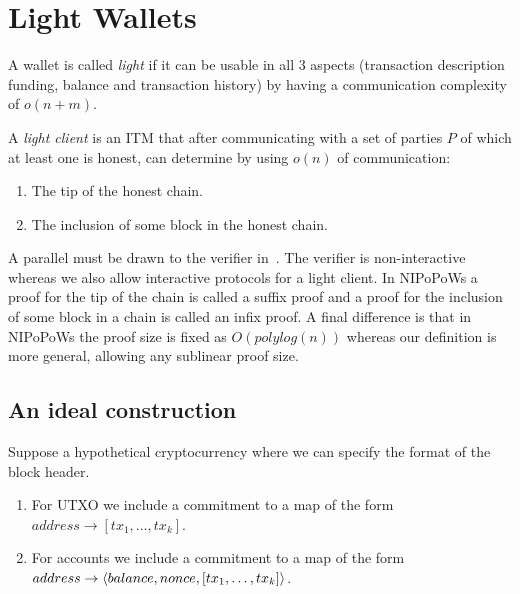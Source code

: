 \section{Light Wallets}
\begin{definition}
A wallet is called \emph{light} if it can be usable in all 3 aspects (transaction description funding, balance and transaction history) by having a communication complexity of $o(n+m)$.
\end{definition}

\begin{definition}
A \emph{light client} is an ITM that after communicating with a set of parties $P$ of which at least one is honest, can determine by using $o(n)$ of communication:
\begin{enumerate}
    \item The tip of the honest chain.
    \item The inclusion of some block in the honest chain.
\end{enumerate}
\end{definition}

A parallel must be drawn to the verifier in~\cite{nipopows}. The verifier is non-interactive whereas we also allow interactive protocols for a light client. In NIPoPoWs a proof for the tip of the chain is called a suffix proof and a proof for the inclusion of some block in a chain is called an infix proof. A final difference is that in NIPoPoWs the proof size is fixed as $O(polylog(n))$ whereas our definition is more general, allowing any sublinear proof size.

\subsection{An ideal construction}
Suppose a hypothetical cryptocurrency where we can specify the format of the block header.

\begin{enumerate}
    \item For UTXO we include a commitment to a map of the form $address \rightarrow [tx_1, \dots, tx_k]$.
    \item For accounts we include a commitment to a map of the form $address \rightarrow \langle balance, nonce, [tx_1, \dots, tx_k]\rangle$.
\end{enumerate}

